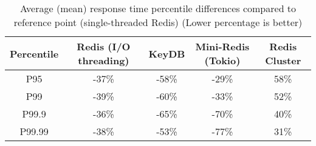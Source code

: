 \begin{table}
    \centering
    \begin{tabular}{c|cccc}
        \toprule
        Percentile & Redis (I/O threading) & KeyDB & Mini-Redis (Tokio) & Redis Cluster \\
        \midrule
            P95 &  -37\% &  -58\% &               -29\% &           58\% \\
            P99 &  -39\% &  -60\% &               -33\% &           52\% \\
            P99.9 &  -36\% &  -65\% &               -70\% &           40\% \\
            P99.99 &  -38\% &  -53\% &               -77\% &           31\% \\
        \bottomrule
    \end{tabular}        
    \caption{Average (mean) response time percentile differences compared to reference point (single-threaded Redis) (Lower percentage is better)}
    \label{tbl:table_avg_latency}
\end{table}